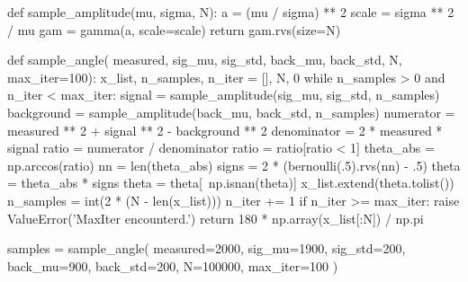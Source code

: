 \documentclass[paper=a4, fontsize=11pt]{scrartcl}
\numberwithin{equation}{section}		%
\numberwithin{figure}{section}			%
\numberwithin{table}{section}				%
\begin{document}
\begin{appendices}
\begin{python}
def sample_amplitude(mu, sigma, N):
    a = (mu / sigma) ** 2
    scale = sigma ** 2 / mu
    gam = gamma(a, scale=scale)
    return gam.rvs(size=N)

def sample_angle(
        measured, sig_mu, sig_std, back_mu, back_std, N, max_iter=100):
    x_list, n_samples, n_iter = [], N, 0
    while n_samples > 0 and n_iter < max_iter:
        signal = sample_amplitude(sig_mu, sig_std, n_samples)
        background = sample_amplitude(back_mu, back_std, n_samples)
        numerator = measured ** 2 + signal ** 2 - background ** 2
        denominator = 2 * measured * signal
        ratio = numerator / denominator
        ratio = ratio[ratio < 1]
        theta_abs = np.arccos(ratio)
        nn = len(theta_abs)
        signs = 2 * (bernoulli(.5).rvs(nn) - .5)
        theta = theta_abs * signs
        theta = theta[~np.isnan(theta)]
        x_list.extend(theta.tolist())
        n_samples = int(2 * (N - len(x_list)))
        n_iter += 1
    if n_iter >= max_iter:
        raise ValueError('MaxIter encounterd.')
    return 180 * np.array(x_list[:N]) / np.pi

samples = sample_angle(
    measured=2000, sig_mu=1900, sig_std=200, back_mu=900, back_std=200,
    N=100000, max_iter=100
)
\end{python}


\end{appendices}









\end{document}
